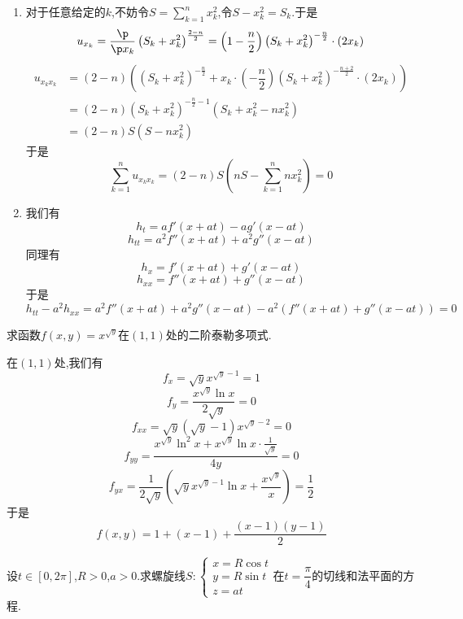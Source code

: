 \documentclass{ctexart}
\begin{document}
\begin{solution}
    \begin{enumerate}[label=\tbf{(\arabic*)}]
        \item 对于任意给定的$k$,不妨令$S=\displaystyle\sum_{k=1}^nx_k^2$,令$S-x_k^2=S_k$.于是
            \[u_{x_k}=\dfrac{\p}{\p x_k}\left(S_k+x_k^2\right)^{\frac{2-n}2}=\left(1-\dfrac{n}{2}\right)\left(S_k+x_k^2\right)^{-\frac{n}{2}}\cdot(2x_k)\]
            \[\begin{aligned}
                u_{x_kx_k}
                &= (2-n)\left((S_k+x_k^2)^{-\frac{n}{2}}+x_k\cdot\left(-\dfrac{n}{2}\right)(S_k+x_k^2)^{-\frac{n+2}{2}}\cdot(2x_k)\right) \\
                &= (2-n)\left(S_k+x_k^2\right)^{-\frac{n}{2}-1}\left(S_k+x_k^2-nx_k^2\right) \\
                &= (2-n)S(S-nx_k^2)
            \end{aligned}\]
            于是
            \[\sum_{k=1}^nu_{x_kx_k}=(2-n)S\left(nS-\sum_{k=1}^nnx_k^2\right)=0\]
        \item 我们有
            \[h_t=af'(x+at)-ag'(x-at)\]
            \[h_{tt}=a^2f''(x+at)+a^2g''(x-at)\]
            同理有\[h_x=f'(x+at)+g'(x-at)\]
            \[h_{xx}=f''(x+at)+g''(x-at)\]
            于是\[h_{tt}-a^2h_{xx}=a^2f''(x+at)+a^2g''(x-at)-a^2\left(f''(x+at)+g''(x-at)\right)=0\]
    \end{enumerate}
\end{solution}
\begin{problem}[4.(10\songti{分})]
    求函数$f(x,y)=x^{\sqrt{y}}$在$(1,1)$处的二阶泰勒多项式.
\end{problem}
\begin{solution}
    在$(1,1)$处,我们有
    \[f_x=\sqrt{y}x^{\sqrt{y}-1}=1\]
    \[f_y=\dfrac{x^{\sqrt{y}}\ln x}{2\sqrt{y}}=0\]
    \[f_{xx}=\sqrt{y}\left(\sqrt{y}-1\right)x^{\sqrt{y}-2}=0\]
    \[f_{yy}=\dfrac{x^{\sqrt{y}}\ln^2x+x^{\sqrt{y}}\ln x\cdot\frac{1}{\sqrt{y}}}{4y}=0\]
    \[f_{yx}=\dfrac{1}{2\sqrt{y}}\left(\sqrt{y}x^{\sqrt{y}-1}\ln x+\dfrac{x^{\sqrt{y}}}{x}\right)=\dfrac12\]
    于是
    \[f(x,y)=1+(x-1)+\dfrac{(x-1)(y-1)}{2}\]
\end{solution}
\begin{problem}[5.(10\songti{分})]
    设$t\in[0,2\pi]$,$R>0$,$a>0$.求螺旋线$S:\left\{\begin{array}{l}
        x=R\cos t\\
        y=R\sin t\\
        z=at
    \end{array}\right.$在$t=\dfrac\pi4$的切线和法平面的方程.
\end{problem}
\end{document}
